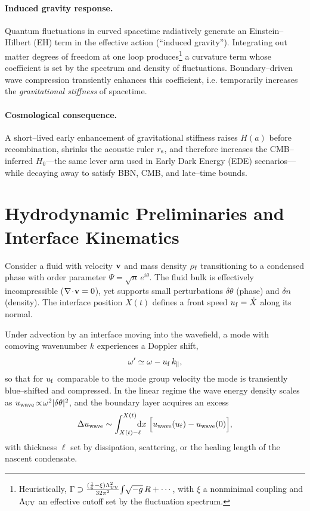 \documentclass[11pt,a4paper]{article}
\newcommand{\rs}{r_{\rm s}}
\newcommand{\dx}{\mathrm{d}}
\newcommand{\be}{\begin{equation}}
\newcommand{\ee}{\end{equation}}
\begin{document}
\paragraph{Induced gravity response.}
Quantum fluctuations in curved spacetime radiatively generate an Einstein--Hilbert (EH) term in the effective action (``induced gravity''). Integrating out matter degrees of freedom at one loop produces\footnote{Heuristically, $\Gamma \supset \frac{(\frac{1}{6}-\xi)\Lambda_{\rm UV}^2}{32\pi^2}\!\int\!\sqrt{-g}\,R+\cdots$, with $\xi$ a nonminimal coupling and $\Lambda_{\rm UV}$ an effective cutoff set by the fluctuation spectrum.} a curvature term whose coefficient is set by the spectrum and density of fluctuations. Boundary--driven wave compression transiently enhances this coefficient, i.e. temporarily increases the \emph{gravitational stiffness} of spacetime.

\paragraph{Cosmological consequence.}
A short--lived early enhancement of gravitational stiffness raises $H(a)$ before recombination, shrinks the acoustic ruler $\rs$, and therefore increases the CMB--inferred $H_0$---the same lever arm used in Early Dark Energy (EDE) scenarios---while decaying away to satisfy BBN, CMB, and late--time bounds.

\section{Hydrodynamic Preliminaries and Interface Kinematics}
Consider a fluid with velocity $\vb v$ and mass density $\rho_{\rm f}$ transitioning to a condensed phase with order parameter $\Psi=\sqrt{n}\,e^{i\theta}$. The fluid bulk is effectively incompressible ($\nabla\!\cdot\!\vb v=0$), yet supports small perturbations $\delta \theta$ (phase) and $\delta n$ (density). The interface position $X(t)$ defines a front speed $u_{\rm f}=\dot X$ along its normal.

Under advection by an interface moving into the wavefield, a mode with comoving wavenumber $k$ experiences a Doppler shift,
\be
\omega' \simeq \omega - u_{\rm f}\,k_{\parallel},
\ee
so that for $u_{\rm f}$ comparable to the mode group velocity the mode is transiently blue--shifted and compressed. In the linear regime the wave energy density scales as $u_{\rm wave}\!\propto\! \omega^2 |\delta\theta|^2$, and the boundary layer acquires an excess
\be
\Delta u_{\rm wave} \sim \int_{X(t)-\ell}^{X(t)} \!\!\!\!\dx x \;\Big[ u_{\rm wave}(u_{\rm f})-u_{\rm wave}(0)\Big],
\ee
with thickness $\ell$ set by dissipation, scattering, or the healing length of the nascent condensate.
\end{document}
